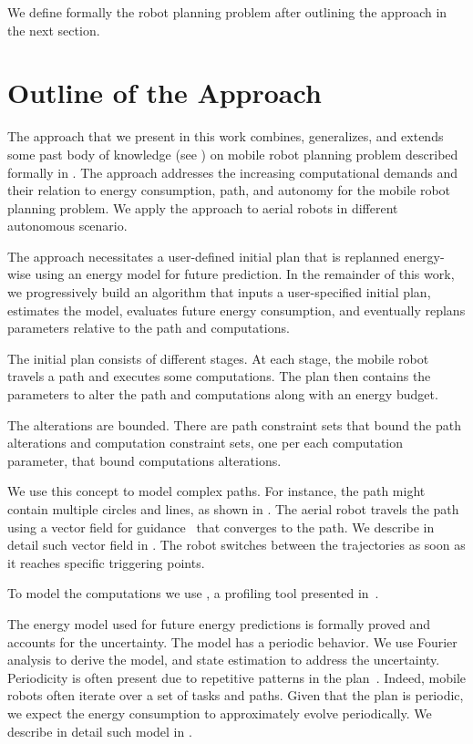 We define formally the robot planning problem after outlining the approach in the next section.


\section{Outline of the Approach}
\label{sec:outline}

The approach that we present in this work combines, generalizes, and extends some past body of knowledge (see ) on mobile robot planning problem described formally in . The approach addresses the increasing computational demands and their relation to energy consumption, path, and autonomy for the mobile robot planning problem. We apply the approach to aerial robots in different autonomous scenario. 

The approach necessitates a user-defined initial plan that is replanned energy-wise using an energy model for future prediction. In the remainder of this work, we progressively build an algorithm that inputs a user-specified initial plan, estimates the model, evaluates future energy consumption, and eventually replans parameters relative to the path and computations. 

The initial plan consists of different stages. At each stage, the mobile robot travels a path and executes some computations. The plan then contains the parameters to alter the path and computations along with an energy budget.

The alterations are bounded. There are path constraint sets that bound the path alterations and computation constraint sets, one per each computation parameter, that bound computations alterations.

We use this concept to model complex paths. For instance, the path might contain multiple circles and lines, as shown in . The aerial robot travels the path using a vector field for guidance~\citep{de2017guidance} that converges to the path. We describe in detail such vector field in . The robot switches between the trajectories as soon as it reaches specific triggering points. 

To model the computations we use \powprof{}, a profiling tool presented in~\citep{seewald2019coarse}. 

The energy model used for future energy predictions is formally proved and accounts for the uncertainty. The model has a periodic behavior. We use Fourier analysis to derive the model, and state estimation to address the uncertainty. Periodicity is often present due to repetitive patterns in the plan~\citep{seewald2020mechanical}. Indeed, mobile robots often iterate over a set of tasks and paths. Given that the plan is periodic, we expect the energy consumption to approximately evolve periodically. We describe in detail such model in . 

